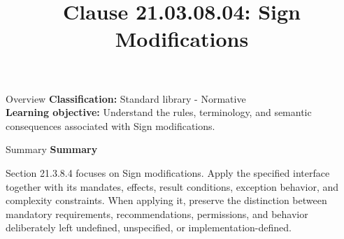 \documentclass[10pt,letterpaper]{article}
\title{Clause 21.03.08.04: Sign Modifications}
\author{}
\date{}
\begin{document}
\maketitle
\begin{CornellOverviewBox}{Overview}
\textbf{Classification:} Standard library - Normative\\[2pt]
\textbf{Learning objective:} Understand the rules, terminology, and semantic consequences associated with Sign modifications.
\end{CornellOverviewBox}\begin{CornellSummaryBox}{Summary}
{\sffamily\bfseries\color{Accent} Summary}\par\vspace{3pt}Section 21.3.8.4 focuses on Sign modifications. Apply the specified interface together with its mandates, effects, result conditions, exception behavior, and complexity constraints. When applying it, preserve the distinction between mandatory requirements, recommendations, permissions, and behavior deliberately left undefined, unspecified, or implementation-defined.
\end{CornellSummaryBox}
\end{document}
